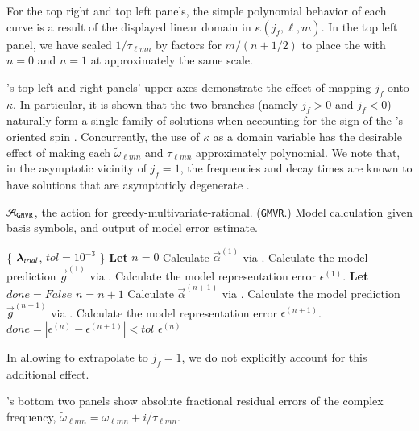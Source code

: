 \documentclass[twocolumn,aps,prd,floatfix,preprintnumbers,a4paper,nofootinbib,
superscriptaddress,10pt]{revtex4-1}
\newcommand{\cw}{\tilde{\omega}}
\def\jf{j_f}
\def\lmn{_{\ell m n}}
\def\gmvr#1{greedy-multivariate-rational#1
  (\texttt{GMVR}#1)\gdef\gmvr{\texttt{GMVR}}}
\begin{document}
%
For the top right and top left panels, the simple polynomial behavior of each curve is a result of the displayed linear domain in $\kappa(\jf,\ell,m)$.
%
In the top left panel, we have scaled $1/\tau\lmn$ by factors for $m/(n+1/2)$ to place the  with $n=0$ and $n=1$ at approximately the same scale.
%
\begin{widetext}
	
\end{widetext}
%
\par {}'s top left and right panels' upper axes demonstrate the effect of mapping $\jf$ onto $\kappa$.
%
In particular, it is shown that the two branches (namely $\jf>0$ and $\jf<0$) naturally form a single family of solutions when accounting for the sign of the \bh{}'s oriented spin \cite{Husa:2015iqa}.
%
Concurrently, the use of $\kappa$ as a domain variable has the desirable effect of making each $\cw\lmn$ and $\tau\lmn$ approximately polynomial.
%
We note that, in the asymptotic vicinity of $\jf=1$, the \qnm{} frequencies and decay times are known to have solutions that are asymptoticly degenerate \cite{Zimmerman:2015trm}.
%
{\scriptsize
\begin{algorithm}[H]
  \caption{$\mathcal{A}_{\gmvr}$, the action for \gmvr. Model calculation given basis symbols, and output of model error estimate.}
  \label{alg:A_gmvr}
  \begin{algorithmic}[1]
     \{ ${\bm{\lambda}}_{trial}$, $tol=10^{-3}$ \}
    \vskip 10pt
    \State \textbf{Let} $n=0$
    \State Calculate $\vec{\alpha}^{(1)}$ via .
    \State Calculate the model prediction $\vec{g}^{(1)}$ via .
    \State Calculate the model representation error $\epsilon^{(1)}$.
    \State \textbf{Let} $done = False$
      \State $n=n+1$
      \State Calculate $\vec{\alpha}^{(n+1)}$  via .
      \State Calculate the model prediction $\vec{g}^{(n+1)}$ via .
      \State Calculate the model representation error $\epsilon^{(n+1)}$.
      \State $done = |\epsilon^{(n)}-\epsilon^{(n+1)}| < tol$
    \EndWhile
    \vskip 10pt
     $\epsilon^{(n)}$
  \end{algorithmic}
\end{algorithm}
}
%
In allowing  to extrapolate to $\jf=1$, we do not explicitly account for this additional effect.
%
\par {}'s bottom two panels show absolute fractional residual errors of the complex frequency, $\cw\lmn = \omega\lmn + i/\tau\lmn$.
\end{document}
